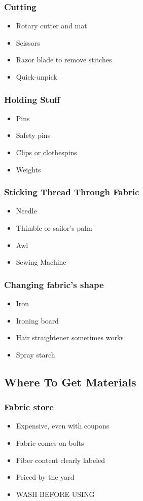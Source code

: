 \documentclass{beamer}
\begin{document}
\begin{frame}[fragile]
\frametitle{Cutting}
\begin{itemize}
\item Rotary cutter and mat
\item Scissors
\item Razor blade to remove stitches
\item Quick-unpick
\end{itemize}
\end{frame}

\begin{frame}[fragile]
\frametitle{Holding Stuff}
\begin{itemize}
\item Pins
\item Safety pins
\item Clips or clothespins
\item Weights
\end{itemize}
\end{frame}

\begin{frame}[fragile]
\frametitle{Sticking Thread Through Fabric}
\begin{itemize}
\item Needle
\item Thimble or sailor's palm
\item Awl
\item Sewing Machine
\end{itemize}
\end{frame}

\begin{frame}[fragile]
\frametitle{Changing fabric's shape}
\begin{itemize}
\item Iron
\item Ironing board
\item Hair straightener sometimes works
\item Spray starch
\end{itemize}
\end{frame}

\subsection{Where To Get Materials}

\begin{frame}[fragile]
\tableofcontents[currentsubsection]
\end{frame}


\begin{frame}[fragile]
\frametitle{Fabric store}
\begin{itemize}
\item Expensive, even with coupons
\item Fabric comes on bolts
\item Fiber content clearly labeled
\item Priced by the yard
\item WASH BEFORE USING
\end{itemize}
\end{frame}
\end{document}
